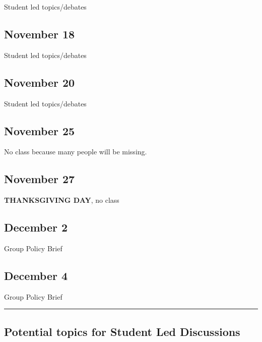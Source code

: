 \documentclass[]{tufte-handout}
\begin{document}
Student led topics/debates

\hypertarget{november-18}{%
\subsection{November 18}\label{november-18}}

Student led topics/debates

\hypertarget{november-20}{%
\subsection{November 20}\label{november-20}}

Student led topics/debates

\hypertarget{november-25}{%
\subsection{November 25}\label{november-25}}

No class because many people will be missing.

\hypertarget{november-27}{%
\subsection{November 27}\label{november-27}}

\textbf{THANKSGIVING DAY}, no class

\hypertarget{december-2}{%
\subsection{December 2}\label{december-2}}

Group Policy Brief

\hypertarget{december-4}{%
\subsection{December 4}\label{december-4}}

Group Policy Brief

\begin{center}\rule{0.5\linewidth}{0.5pt}\end{center}

\hypertarget{potential-topics-for-student-led-discussions}{%
\subsection{Potential topics for Student Led
Discussions}\label{potential-topics-for-student-led-discussions}}
\end{document}
